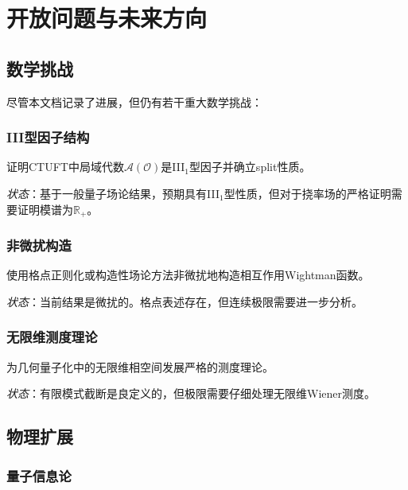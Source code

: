 \section{开放问题与未来方向}
\label{sec:open_problems}

\subsection{数学挑战}

尽管本文档记录了进展，但仍有若干重大数学挑战：

\subsubsection{III型因子结构}

\begin{problem}
证明CTUFT中局域代数$\mathcal{A}(\mathcal{O})$是III$_1$型因子并确立split性质。
\end{problem}

\textit{状态}：基于一般量子场论结果，预期具有III$_1$型性质，但对于挠率场的严格证明需要证明模谱为$\mathbb{R}_+$。

\subsubsection{非微扰构造}

\begin{problem}
使用格点正则化或构造性场论方法非微扰地构造相互作用Wightman函数。
\end{problem}

\textit{状态}：当前结果是微扰的。格点表述存在，但连续极限需要进一步分析。

\subsubsection{无限维测度理论}

\begin{problem}
为几何量子化中的无限维相空间发展严格的测度理论。
\end{problem}

\textit{状态}：有限模式截断是良定义的，但极限需要仔细处理无限维Wiener测度。

\subsection{物理扩展}

\subsubsection{量子信息论}

